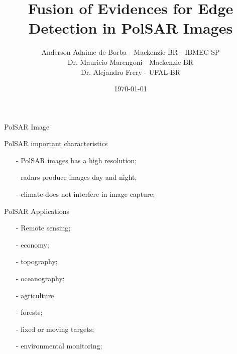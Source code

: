 \documentclass[10pt]{beamer}
\title{Fusion of Evidences for Edge Detection in PolSAR Images}
\date{\today}
\author{Anderson Adaime de Borba - Mackenzie-BR - IBMEC-SP\\
        Dr. Mauricio Marengoni - Mackenzie-BR\\
        Dr. Alejandro Frery - UFAL-BR}
\institute{TENGARSS- 2019}
\begin{document}
\maketitle


\begin{frame}[fragile]{PolSAR Image}
\begin{alertblock}{PolSAR important characteristics}
\begin{itemize}
\item[-] PolSAR images has a high resolution;
\item[-] radars produce images day and night;
\item[-] climate does not interfere in image capture;
\end{itemize}
\end{alertblock}
\begin{alertblock}{PolSAR Applications}
\begin{itemize}
\item[-] Remote sensing;
\item[-] economy;
\item[-] topography;
\item[-] oceanography;
\item[-] agriculture
\item[-] forests;
\item[-] fixed or moving targets;
\item[-] environmental monitoring;
\end{itemize}
\end{alertblock}
\end{frame}
\end{document}
